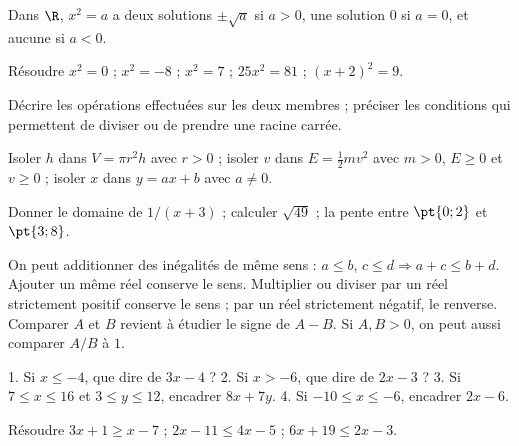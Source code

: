 \begin{keypoint}[Rappel]
Dans $\R$, $x^2=a$ a deux solutions $\pm\sqrt a$ si $a>0$, une solution $0$ si $a=0$, et aucune si $a<0$.
\end{keypoint}
\begin{example}Résoudre $x^2=0$ ; $x^2=-8$ ; $x^2=7$ ; $25x^2=81$ ; $(x+2)^2=9$.\end{example}
\begin{method}
Décrire les opérations effectuées sur les deux membres ; préciser les conditions qui permettent de diviser ou de prendre une racine carrée.
\end{method}
\begin{example}Isoler $h$ dans $V=\pi r^2h$ avec $r>0$ ; isoler $v$ dans $E=\frac12mv^2$ avec $m>0$, $E\geq0$ et $v\geq0$ ; isoler $x$ dans $y=ax+b$ avec $a\ne0$.\end{example}
\begin{fluency}[5--10 min]Donner le domaine de $1/(x+3)$ ; calculer $\sqrt{49}$ ; la pente entre $\pt{0;2}$ et $\pt{3;8}$.\end{fluency}

\begin{keypoint}[Règles]
On peut additionner des inégalités de même sens : $a\leq b$, $c\leq d\Rightarrow a+c\leq b+d$. Ajouter un même réel conserve le sens. Multiplier ou diviser par un réel strictement positif conserve le sens ; par un réel strictement négatif, le renverse.
Comparer $A$ et $B$ revient à étudier le signe de $A-B$. Si $A,B>0$, on peut aussi comparer $A/B$ à $1$.
\end{keypoint}
\begin{example}1. Si $x\leq-4$, que dire de $3x-4$ ? 2. Si $x>-6$, que dire de $2x-3$ ? 3. Si $7\leq x\leq16$ et $3\leq y\leq12$, encadrer $8x+7y$. 4. Si $-10\leq x\leq-6$, encadrer $2x-6$.\end{example}
\begin{example}Résoudre $3x+1\geq x-7$ ; $2x-11\leq4x-5$ ; $6x+19\leq2x-3$.\end{example}

